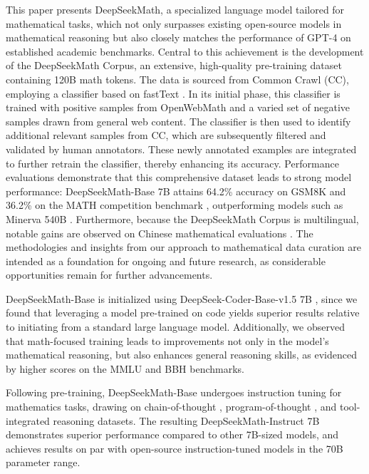 This paper presents DeepSeekMath, a specialized language model tailored for mathematical tasks, which not only surpasses existing open-source models in mathematical reasoning but also closely matches the performance of GPT-4 on established academic benchmarks. Central to this achievement is the development of the DeepSeekMath Corpus, an extensive, high-quality pre-training dataset containing 120B math tokens. The data is sourced from Common Crawl (CC), employing a classifier based on fastText \citep{joulin2016fasttext}. In its initial phase, this classifier is trained with positive samples from OpenWebMath \citep{openwebmath} and a varied set of negative samples drawn from general web content. The classifier is then used to identify additional relevant samples from CC, which are subsequently filtered and validated by human annotators. These newly annotated examples are integrated to further retrain the classifier, thereby enhancing its accuracy. Performance evaluations demonstrate that this comprehensive dataset leads to strong model performance: DeepSeekMath-Base 7B attains 64.2\% accuracy on GSM8K \citep{gsm8k} and 36.2\% on the MATH competition benchmark \citep{MATH}, outperforming models such as Minerva 540B \citep{minerva}. Furthermore, because the DeepSeekMath Corpus is multilingual, notable gains are observed on Chinese mathematical evaluations \citep{wei2023cmath,agieval}. The methodologies and insights from our approach to mathematical data curation are intended as a foundation for ongoing and future research, as considerable opportunities remain for further advancements.

DeepSeekMath-Base is initialized using DeepSeek-Coder-Base-v1.5 7B \citep{deepseek-coder}, since we found that leveraging a model pre-trained on code yields superior results relative to initiating from a standard large language model. Additionally, we observed that math-focused training leads to improvements not only in the model’s mathematical reasoning, but also enhances general reasoning skills, as evidenced by higher scores on the MMLU \citep{mmlu} and BBH \citep{bbh} benchmarks.

Following pre-training, DeepSeekMath-Base undergoes instruction tuning for mathematics tasks, drawing on chain-of-thought \citep{cot}, program-of-thought \citep{pot,pal}, and tool-integrated reasoning \citep{tora} datasets. The resulting DeepSeekMath-Instruct 7B demonstrates superior performance compared to other 7B-sized models, and achieves results on par with open-source instruction-tuned models in the 70B parameter range.

